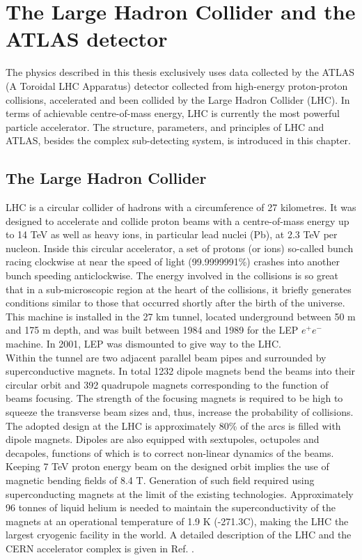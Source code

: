 \newpage
\chapter{The Large Hadron Collider and the ATLAS detector}
\label{LHC&ATLAS}

The physics described in this thesis exclusively uses data collected by the ATLAS (A Toroidal LHC Apparatus) detector collected from high-energy proton-proton collisions, accelerated and been collided by the Large Hadron Collider (LHC). In terms of achievable centre-of-mass energy, LHC is currently the most powerful particle accelerator. The structure, parameters, and principles of LHC and ATLAS, besides the complex sub-detecting system, is introduced in this chapter.

\section{The Large Hadron Collider}
\label{chap2:LHC}
LHC is a circular collider of hadrons with a circumference of 27 kilometres. It was designed to accelerate and collide proton beams with a centre-of-mass energy up to 14 TeV as well as heavy ions, in particular lead nuclei (Pb), at 2.3 TeV per nucleon. Inside this circular accelerator, a set of protons (or ions) so-called bunch racing clockwise at near the speed of light (99.9999991\%) crashes into another bunch speeding anticlockwise. The energy involved in the collisions is so great that in a sub-microscopic region at the heart of the collisions, it briefly generates conditions similar to those that occurred shortly after the birth of the universe. This machine is installed in the 27 km tunnel, located underground between 50 m and 175 m depth, and was built between 1984 and 1989 for the LEP $e^+e^-$ machine. In 2001, LEP was dismounted to give way to the LHC. \\ 
Within the tunnel are two adjacent parallel beam pipes and surrounded by superconductive magnets. In total 1232 dipole magnets bend the beams into their circular orbit and 392 quadrupole magnets corresponding to the function of beams focusing. The strength of the focusing magnets is required to be high to squeeze the transverse beam sizes and, thus, increase the probability of collisions. The adopted design at the LHC is approximately 80\% of the arcs is filled with dipole magnets. Dipoles are also equipped with sextupoles, octupoles and decapoles, functions of which is to correct non-linear dynamics of the beams.  Keeping 7 TeV proton energy beam on the designed orbit implies the use of magnetic bending fields of 8.4 T. Generation of such field required using superconducting magnets at the limit of the existing technologies. Approximately 96 tonnes of liquid helium is needed to maintain the superconductivity of the magnets at an operational temperature of 1.9 K (-271.3C), making the LHC the largest cryogenic facility in the world.  A detailed description of the LHC and the CERN accelerator complex is given in Ref. \cite{LHCTDR}.


